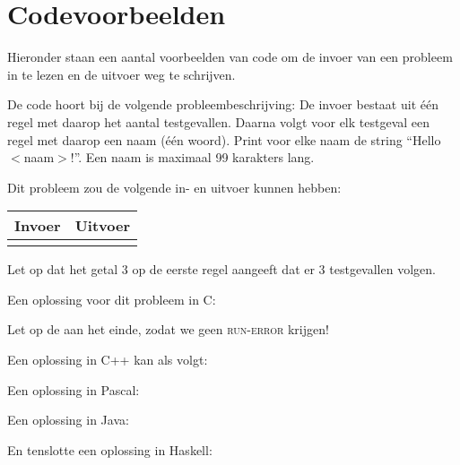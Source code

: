 \newpage
\appendix

\section{Codevoorbeelden}\label{codeexamples}

Hieronder staan een aantal voorbeelden van code om de invoer van een
probleem in te lezen en de uitvoer weg te schrijven.

De code hoort bij de volgende probleembeschrijving: 
De invoer bestaat uit \'e\'en regel met daarop het aantal testgevallen.
Daarna volgt voor elk testgeval een regel met daarop een naam (\'e\'en
woord). Print voor elke naam de string ``Hello $<$naam$>$!''. Een naam
is maximaal 99 karakters lang.

Dit probleem zou de volgende in- en uitvoer kunnen hebben:

\begin{tabular}{|p{}|p{}|}
\hline
\textbf{Invoer} & \textbf{Uitvoer} \\
\hline
 &
 \\
\hline
\end{tabular}

Let op dat het getal 3 op de eerste regel aangeeft dat er 3
testgevallen volgen.

Een oplossing voor dit probleem in C:

Let op de  aan het einde, zodat we geen
\textsc{run-error} krijgen!

\newpage

Een oplossing in C++ kan als volgt:

Een oplossing in Pascal:

\newpage

Een oplossing in Java:

En tenslotte een oplossing in Haskell:


